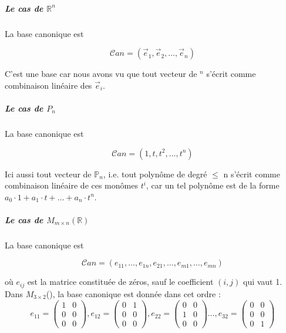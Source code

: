 \subparagraph{Le cas de $\mathbb{R}^n$}
La base canonique est 
\begin{formule}

\[
\mathcal{C}an = (\vec{e}_1, \vec{e}_2, \ldots, \vec{e}_n)
\]
\end{formule}
C'est une base car nous avons vu que tout vecteur de \R$^n$ s'écrit comme combinaison linéaire des $\vec{e}_i$.
\\
\subparagraph{Le cas de $P_n$}
La base canonique est 
\begin{formule}
    

\[
\mathcal{C}an = (1, t, t^2, \ldots, t^n)
\]
\end{formule}
Ici aussi tout vecteur de $\mathbb{P}_n$, i.e. tout polynôme de degré $\leq$ n s'écrit comme combinaison linéaire de ces monômes $t^i$, car un tel polynôme est de la forme $a_0\cdot 1 + a_1\cdot t + \dots + a_n\cdot t^n$.
\subparagraph{Le cas de $M_{m \times n}(\mathbb{R})$}
La base canonique est 
\begin{formule}
\[
\mathcal{C}an = (e_{11}, \ldots, e_{1n}, e_{21}, \ldots, e_{m1}, \ldots, e_{mn})
\]
\end{formule}
où $e_{ij}$ est la matrice constituée de zéros, sauf le coefficient $(i, j)$ qui vaut 1. Dans $M_{3\times 2}$(\R), la base canonique est donnée dans cet ordre :
\\
\[e_{11} = \begin{pmatrix}
    1 & 0\\
    0 & 0 \\
    0 & 0
\end{pmatrix}, e_{12} = \begin{pmatrix}
    0 & 1 \\ 0 & 0 \\ 0 & 0
\end{pmatrix}, e_{22} = \begin{pmatrix}
    0 & 0 \\ 1 & 0 \\ 0 & 0
\end{pmatrix} \dots, e_{32} = \begin{pmatrix}
    0 & 0 \\ 0 & 0 \\ 0 & 1
\end{pmatrix} \]

